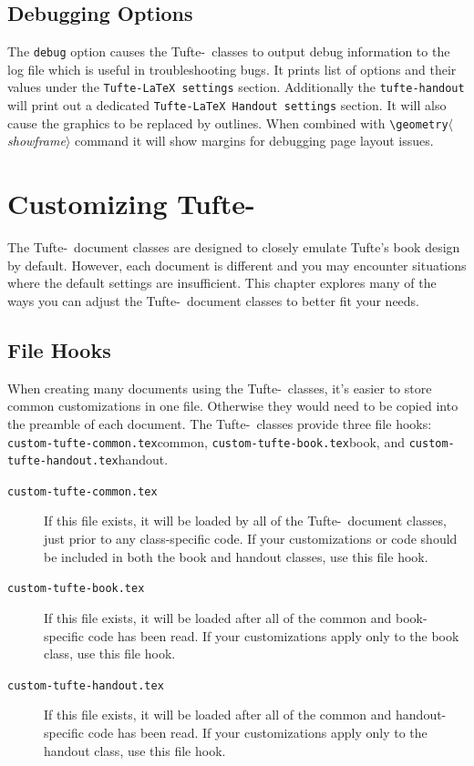 \documentclass[a4paper]{tufte-handout}
\newcommand{\TL}{Tufte-\hologo{LaTeX}\xspace}
\newcommand{\hlorange}[1]{\textcolor{tufte-orange}{#1}}
\newcommand{\doccmd}[1]{\hlorange{\texttt{\textbackslash#1}}}
\newcommand{\docopt}[1]{\( \langle \)\textrm{\textit{#1}}\( \rangle \)}
\newcommand{\doccls}[1]{\texttt{#1}}
\newcommand{\docclsopt}[1]{\hlorange{\texttt{#1}}}
\newcommand{\docfilehook}[1]{\texttt{#1}}
\begin{document}
\subsection{Debugging Options}\label{ssec:debugging-options}
The \docclsopt{debug} option causes the \TL\ classes to output debug information to the log file which is useful in troubleshooting bugs.
It prints list of options and their values under the \texttt{Tufte-LaTeX settings} section.
Additionally the \doccls{tufte-handout} will print out a dedicated \texttt{Tufte-LaTeX Handout settings} section.
It will also cause the graphics to be replaced by outlines.
When combined with \doccmd{geometry}\docopt{showframe} command it will show margins for debugging page layout issues.


\pagebreak
\section[Customizing Tufte-LaTeX]{Customizing \TL}\label{sec:customizing-tufte-latex}
The \TL\ document classes are designed to closely emulate Tufte's book design by default.
However, each document is different and you may encounter situations where the default settings are insufficient.
This chapter explores many of the ways you can adjust the \TL\ document classes to better fit your needs.

\subsection{File Hooks}\label{sec:file-hooks}
When creating many documents using the \TL\ classes, it's easier to store common customizations in one file.
Otherwise they would need to be copied into the preamble of each document.
The \TL\ classes provide three file hooks: \docfilehook{custom-tufte-common.tex}{common}, \docfilehook{custom-tufte-book.tex}{book}, and \docfilehook{custom-tufte-handout.tex}{handout}.\sloppy

\begin{description}
  \item[\docfilehook{custom-tufte-common.tex}]
    If this file exists, it will be loaded by all of the \TL\ document classes, just prior to any class-specific code. If your customizations or code should be included in both the book and handout classes, use this file hook.
  \item[\docfilehook{custom-tufte-book.tex}] 
    If this file exists, it will be loaded after all of the common and book-specific code has been read. 
    If your customizations apply only to the book class, use this file hook.
  \item[\docfilehook{custom-tufte-handout.tex}] 
    If this file exists, it will be loaded after all of the common and handout-specific code has been read.
    If your customizations apply only to the handout class, use this file hook.
\end{description}
\end{document}
